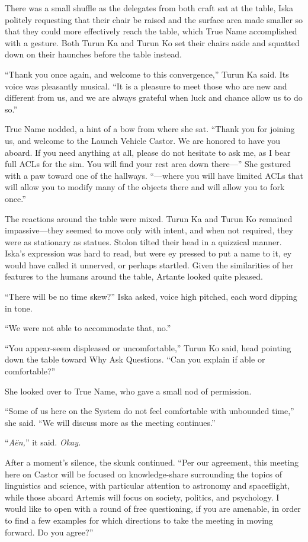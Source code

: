 There was a small shuffle as the delegates from both craft sat at the table, Iska politely requesting that their chair be raised and the surface area made smaller so that they could more effectively reach the table, which True Name accomplished with a gesture. Both Turun Ka and Turun Ko set their chairs aside and squatted down on their haunches before the table instead.

``Thank you once again, and welcome to this convergence,'' Turun Ka said. Its voice was pleasantly musical. ``It is a pleasure to meet those who are new and different from us, and we are always grateful when luck and chance allow us to do so.''

True Name nodded, a hint of a bow from where she sat. ``Thank you for joining us, and welcome to the Launch Vehicle Castor. We are honored to have you aboard. If you need anything at all, please do not hesitate to ask me, as I bear full ACLs for the sim. You will find your rest area down there—'' She gestured with a paw toward one of the hallways. ``—where you will have limited ACLs that will allow you to modify many of the objects there and will allow you to fork once.''

The reactions around the table were mixed. Turun Ka and Turun Ko remained impassive—they seemed to move only with intent, and when not required, they were as stationary as statues. Stolon tilted their head in a quizzical manner. Iska's expression was hard to read, but were ey pressed to put a name to it, ey would have called it unnerved, or perhaps startled. Given the similarities of her features to the humans around the table, Artante looked quite pleased.

``There will be no time skew?'' Iska asked, voice high pitched, each word dipping in tone.

``We were not able to accommodate that, no.''

``You appear-seem displeased or uncomfortable,'' Turun Ko said, head pointing down the table toward Why Ask Questions. ``Can you explain if able or comfortable?''

She looked over to True Name, who gave a small nod of permission.

``Some of us here on the System do not feel comfortable with unbounded time,'' she said. ``We will discuss more as the meeting continues.''

``\emph{Aën,}'' it said. \emph{Okay.}

After a moment's silence, the skunk continued. ``Per our agreement, this meeting here on Castor will be focused on knowledge-share surrounding the topics of linguistics and science, with particular attention to astronomy and spaceflight, while those aboard Artemis will focus on society, politics, and psychology. I would like to open with a round of free questioning, if you are amenable, in order to find a few examples for which directions to take the meeting in moving forward. Do you agree?''

